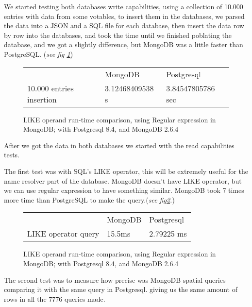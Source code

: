 \documentclass[11pt,twoside]{article}
\begin{document}
    We started testing both databases write capabilities, using a collection of 10.000 entries with data from some votables, to insert them
    in the databases, we parsed the data into a JSON and a SQL file for each database, then insert the data row by row into the databases, and
    took the time until we finished poblating the database, and we got a slightly difference, but MongoDB was a little faster than PostgreSQL. (\emph{see fig \ref{fig:insert}})
    
 \begin{figure}
    \centering
    \begin{tabular}{lll}    
                        & MongoDB & Postgresql \\
    10.000 entries insertion & 3.12468409538 s  & 3.84547805786 sec
    \end{tabular}
    \caption{LIKE operand run-time comparison, using Regular expression in MongoDB; with Postgresql 8.4, and MongoDB 2.6.4}
    \label{fig:insert}
\end{figure}   
    
    After we got the data in both databases we started with the read capabilities tests.
    
    The first test was with SQL’s LIKE operator, this will be extremely useful for the name resolver part of the database. 
    MongoDB doesn’t have LIKE operator, but we can use regular expression to have something similar. MongoDB took 7 times more time than
    PostgreSQL to make the query.(\emph{see fig\ref{fig:like}.})
\begin{figure}
    \centering
    \begin{tabular}{lll}    
                        & MongoDB & Postgresql \\
    LIKE operator query & 15.5ms  & 2.79225 ms
    \end{tabular}
    \caption{LIKE operand run-time comparison, using Regular expression in MongoDB; with Postgresql 8.4, and MongoDB 2.6.4}
    \label{fig:like}
\end{figure}

    The second test was to measure how precise was MongoDB spatial queries comparing it with the same query in Postgresql.
    giving us the same amount of rows in all the 7776 queries made.
                
\end{document}
